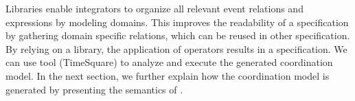 


Libraries enable integrators to organize all relevant event relations and expressions by modeling domains. This improves the readability of a \bcool specification by gathering domain specific relations, which can be reused in other specification. By relying on a \moccml library, the application of \bcool operators results in a \ccsl specification. We can use \ccsl tool (\eg TimeSquare\cite{timesquarebib}) to analyze and execute the generated coordination model. In the next section, we further explain how the coordination model is generated by presenting the semantics of \bcool.   




	

